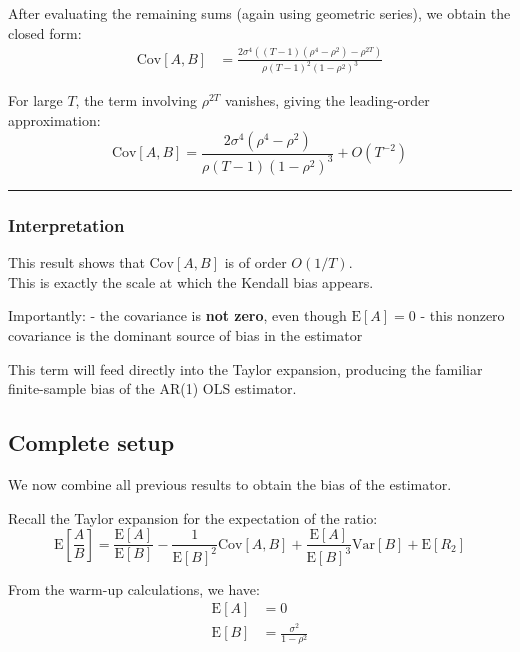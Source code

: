 \documentclass[11pt]{article}
\begin{document}
After evaluating the remaining sums (again using geometric series), we
obtain the closed form: \[
\begin{aligned}
\text{Cov}\left[A,B\right]
&=
\frac{2\sigma^4\left((T-1)(\rho^4-\rho^2)-\rho^{2T}\right)}
{\rho (T-1)^2(1-\rho^2)^3}
\end{aligned}
\]

For large \(T\), the term involving \(\rho^{2T}\) vanishes, giving the
leading-order approximation: \[
\text{Cov}\left[A,B\right]
=\frac{2\sigma^4\left(\rho^4-\rho^2\right)}
{\rho (T-1)(1-\rho^2)^3}+O(T^{-2})
\]

\begin{center}\rule{0.5\linewidth}{0.5pt}\end{center}

\subsubsection{Interpretation}\label{interpretation}

This result shows that \(\text{Cov}[A,B]\) is of order \(O(1/T)\).\\
This is exactly the scale at which the Kendall bias appears.

Importantly: - the covariance is \textbf{not zero}, even though
\(\text{E}[A]=0\) - this nonzero covariance is the dominant source of
bias in the estimator

This term will feed directly into the Taylor expansion, producing the
familiar finite-sample bias of the AR(1) OLS estimator.

    \subsection{Complete setup}\label{complete-setup}

We now combine all previous results to obtain the bias of the estimator.

Recall the Taylor expansion for the expectation of the ratio: \[
\text{E}\left[\frac{A}{B}\right]
=\frac{\text{E}[A]}{\text{E}[B]}
-\frac{1}{\text{E}[B]^2}\text{Cov}\left[A,B\right]
+\frac{\text{E}[A]}{\text{E}[B]^3}\text{Var}\left[B\right]
+\text{E}\left[R_2\right]
\]

From the warm-up calculations, we have: \[
\begin{aligned}
\text{E}\left[A\right] &= 0 \\
\text{E}\left[B\right] &= \frac{\sigma^2}{1-\rho^{2}}
\end{aligned}
\]
\end{document}
